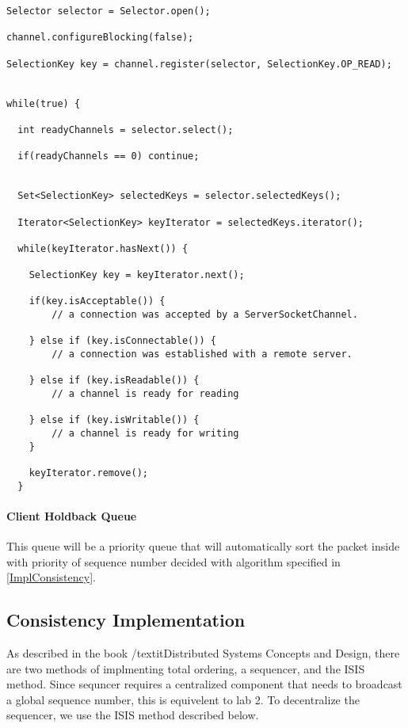 {
\singlespacing
\begin{lstlisting}[caption = {[ClientListener.java]Sample code of Selector monitoring a list of channel}, label = CodeSelector]
Selector selector = Selector.open();

channel.configureBlocking(false);

SelectionKey key = channel.register(selector, SelectionKey.OP_READ);


while(true) {

  int readyChannels = selector.select();

  if(readyChannels == 0) continue;


  Set<SelectionKey> selectedKeys = selector.selectedKeys();

  Iterator<SelectionKey> keyIterator = selectedKeys.iterator();

  while(keyIterator.hasNext()) {

    SelectionKey key = keyIterator.next();

    if(key.isAcceptable()) {
        // a connection was accepted by a ServerSocketChannel.

    } else if (key.isConnectable()) {
        // a connection was established with a remote server.

    } else if (key.isReadable()) {
        // a channel is ready for reading

    } else if (key.isWritable()) {
        // a channel is ready for writing
    }

    keyIterator.remove();
  }
\end{lstlisting}
}

\paragraph*{Client Holdback Queue}

This queue will be a priority queue that will automatically sort the packet inside with priority of sequence number decided with algorithm specified in \ref{ImplConsistency}.

\subsection*{Consistency Implementation}\label{ImplConsistency}

As described in the book /textit{Distributed Systems Concepts and Design}, there are two methods of implmenting total ordering, a sequencer, and the ISIS method. Since sequncer requires a centralized component that needs to broadcast a global sequence number, this is equivelent to lab 2. To decentralize the sequencer, we use the ISIS method described below.

